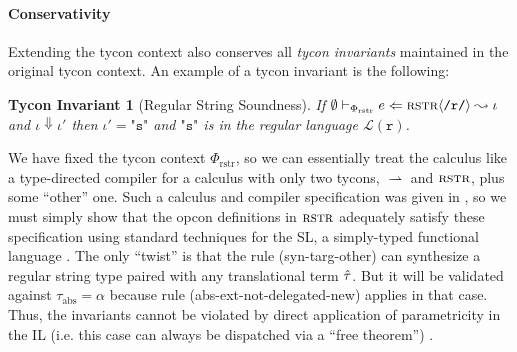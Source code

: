 \documentclass[preprint]{sigplanconf}
\newtheorem{theorem}{Theorem}
\newtheorem{tyconinvariant}{Tycon Invariant}
\newenvironment{proof-sketch}{\noindent{\emph{Proof Sketch.}}}{\qed}
\begin{document}

\paragraph{Conservativity} 
Extending the tycon context also conserves all \emph{tycon invariants} maintained in the original tycon context. An example of a tycon invariant is the following:

\begin{tyconinvariant}[Regular String Soundness]
If $\emptyset \vdash_{\Phi_\text{rstr}} e \Leftarrow {\textsc{rstr}}\langle\texttt{/r/}\rangle \leadsto \iota$ and $\iota \Downarrow \iota'$ then $\iota'=\texttt{"s"}$ and $\texttt{"s"}$ is in the regular language $\mathcal{L}(\texttt{r})$.
\end{tyconinvariant}
\begin{proof-sketch} We have fixed the tycon context $\Phi_\text{rstr}$, so we can essentially treat the calculus like a type-directed compiler for a calculus with only two tycons, $\rightharpoonup$ and $\textsc{rstr}$, plus some ``other'' one. Such a calculus and compiler specification was given in \cite{sanitation-psp14}, so we must simply show that the opcon definitions in $\textsc{rstr}$ adequately satisfy these specification using standard techniques for the SL, a simply-typed functional language \cite{conf/pldi/Chlipala07}. The only ``twist'' is that the rule (syn-targ-other) can synthesize a regular string type paired with any translational term $\hat{\tau}$. But it will be validated against $\tau_\text{abs}=\alpha$ because rule (abs-ext-not-delegated-new) applies in that case.  Thus, the invariants cannot be violated by direct application of parametricity in the IL (i.e. this case can always be dispatched via a ``free theorem'') \cite{WadlerThms}. \end{proof-sketch}
\end{document}
